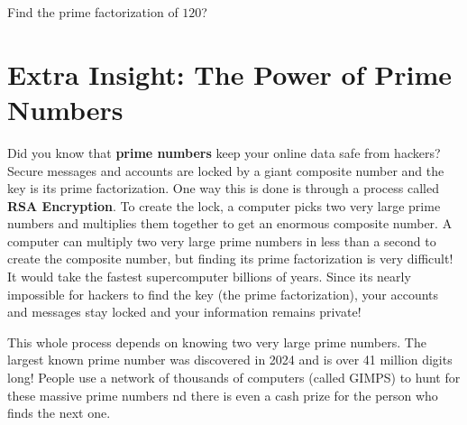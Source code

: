 \documentclass{ximera}[font=12pt]  %
\begin{document}
\begin{problem}
  Find the prime factorization of $120$?

  \begin{multipleChoice}
  \end{multipleChoice}


\end{problem}

\section*{Extra Insight:  The Power of Prime Numbers}

Did you know that \textbf{prime numbers} keep your online data safe from hackers?  Secure messages and accounts are locked by 
a giant composite number and the key is its prime factorization.  One way this is done is through a process called \textbf{RSA Encryption}.  
To create the lock, a computer picks two very large prime numbers and multiplies them together to get an enormous composite number.  
A computer can multiply two very large prime numbers in less than a second to create the composite number, but finding its prime 
factorization is very difficult!  It would take the fastest supercomputer billions of years.  Since its nearly impossible for hackers 
to find the key (the prime factorization), your accounts and messages stay locked and your information remains private!

This whole process depends on knowing two very large prime numbers. The largest known prime number was discovered in 2024 and is 
over 41 million digits long! People use a network of thousands of computers (called GIMPS) to hunt for these massive prime numbers 
nd there is even a cash prize for the person who finds the next one.
\end{document}
